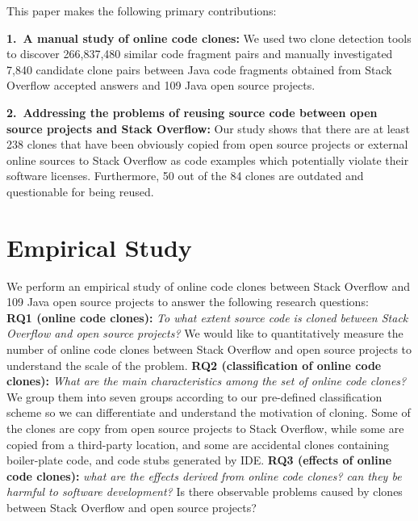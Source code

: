 \documentclass{sig-alternate-05-2015}
\begin{document}
This paper makes the following  primary contributions:

\vspace{0.5ex}%
\noindent\textbf{1.~A manual study of online code clones:} 
We used two clone detection tools to discover 266,837,480 similar code fragment pairs and manually investigated 7,840 candidate clone pairs between Java code fragments obtained from Stack Overflow accepted answers and 109 Java open source projects.

\vspace{0.5ex}%
\noindent\textbf{2.~Addressing the problems of reusing source code between open source projects and Stack Overflow:} Our study shows that there are at least 238 clones that have been obviously copied from open source projects or external online sources to Stack Overflow as code examples which potentially violate their software licenses. Furthermore, 50 out of the 84 clones are outdated and questionable for being reused.

\section{Empirical Study}
We perform an empirical study of online code clones between Stack Overflow and 109 Java open source projects to answer the following research questions: \\ 
\textbf{RQ1 (online code clones):} \textit{To what extent  source code is cloned between Stack Overflow and open source projects?} We would like to quantitatively measure the number of online code clones between Stack Overflow and open source projects to understand the scale of the problem. \newline
\textbf{RQ2 (classification of online code clones):} \textit{What are the main characteristics among the set of online code clones?} We group them into seven groups according to our pre-defined classification scheme so we can differentiate and understand the motivation of cloning. Some of the clones are copy from open source projects to Stack Overflow, while some are copied from a third-party location, and some are accidental clones containing boiler-plate code, and code stubs generated by IDE. \newline
\textbf{RQ3 (effects of online code clones):} \textit{what are the effects derived from online code clones? can they be harmful to software development?} Is there observable problems caused by clones between Stack Overflow and open source projects?
\end{document}
